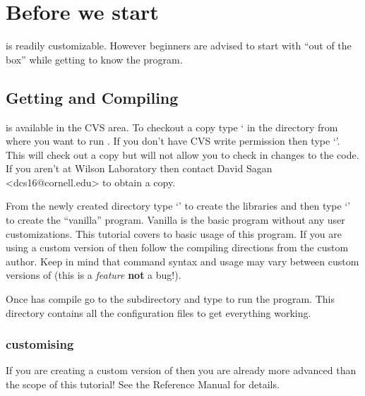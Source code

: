 \documentclass{report}
\begin{document}
\setlength{\parskip}{\dPar}
\setlength{\parindent}{0ex}

\chapter{Before we start}
\label{c:before_beginning}

\tao is readily customizable. However beginners are advised to start with
``out of the box'' \tao while getting to know the program.

\section{Getting and Compiling \tao}

\tao is available in the \cesr CVS area. To checkout a copy type ` in the directory from where you want to run \tao. If you don't have \cesr
CVS write permission then type `'. This will check out a copy
but will not allow you to check in changes to the code. If you aren't at Wilson
Laboratory then contact David Sagan <dcs16@cornell.edu> to obtain a copy. 

From the newly created  directory type `' to create the
libraries and then type `' to create
the ``vanilla'' \tao program. Vanilla \tao is the basic \tao program without any
user customizations. This tutorial covers to basic usage of this program.
If you are using a custom version of \tao then
follow the compiling directions from the custom \tao author. Keep in mind that
command syntax and usage may vary between custom versions of \tao (this is a
\textit{feature} \textbf{not} a bug!).

Once \tao has compile go to the subdirectory  and type
 to run the program. This directory contains all the
configuration files to get everything working.

\subsection{customising \tao}

If you are creating a custom version of \tao then you are already more advanced than
the scope of this tutorial! See the \tao Reference Manual for details.

\end{document}
